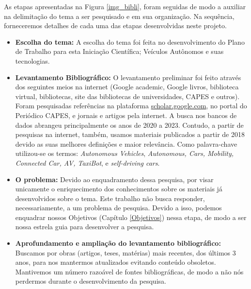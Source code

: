 As etapas apresentadas na Figura \ref{img_bibli}, foram seguidas de modo a auxiliar na
delimitação do tema a ser pesquisado e em sua organização. Na sequência, forneceremos detalhes de cada uma das etapas desenvolvidas neste projeto.
\begin{itemize}\label{details}

\item \textbf{Escolha do tema:} A escolha do tema foi feita no desenvolvimento do Plano de Trabalho para esta Iniciação Científica; Veículos Autônomos e suas tecnologias. 

\item \textbf{Levantamento Bibliográfico:} O levantamento preliminar foi feito através dos seguintes meios na internet (Google academic, Google livros, biblioteca virtual, bibliotecas, site das bibliotecas de universidades, CAPES e outros). Foram pesquisadas referências na plataforma \url{scholar.google.com}, no portal do Periódico CAPES, e jornais e artigos pela internet. A busca nos bancos de dados abrangeu principalmente os anos de 2020 a 2023. Contudo, a partir de pesquisas na internet, também, usamos materiais publicados a partir de 2018 devido as suas melhores definições e maior relevância. Como palavra-chave utilizou-se os termos: \textit{Autonomous Vehicles}, \textit{Autonomous, Cars, Mobility, Connected Car, AV, TaxiBot}, e \textit{self-driving cars}.  %


\item \textbf{O problema:} Devido ao enquadramento dessa pesquisa, por visar unicamente o enriquecimento dos conhecimentos sobre os materiais já desenvolvidos sobre o tema. Este trabalho não busca responder, necessariamente, a um problema de pesquisa. Devido a isso, podemos enquadrar nossos Objetivos (Capítulo \ref{Objetivos}) nessa etapa, de modo a ser nossa estrela guia para desenvolver a pesquisa.

\item \textbf{Aprofundamento e ampliação do levantamento bibliográfico:} Buscamos por obras (artigos, teses, matérias) mais recentes, dos últimos 3 anos, para nos mantermos atualizados evitando conteúdo obsoletos. Mantivemos um número razoável de fontes bibliográficas, de modo a não nós perdermos durante o desenvolvimento da pesquisa. 


\end{itemize}
